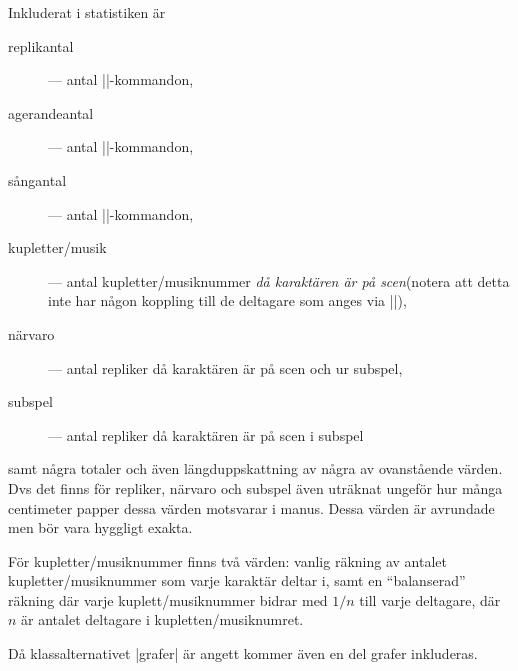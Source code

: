 \documentclass[a4paper,12pt]{article}
\begin{document}
Inkluderat i statistiken är
\begin{description}
	\item[replikantal] --- antal |\Namn|-kommandon,
	\item[agerandeantal] --- antal |\Namngr|-kommandon,
	\item[sångantal] --- antal |\Namnsj|-kommandon,
	\item[kupletter/musik] --- antal kupletter/musiknummer \emph{då karaktären är på scen}(notera att detta inte har någon koppling till de deltagare som anges via |\deltagare|),
	\item[närvaro] --- antal repliker då karaktären är på scen och ur subspel,
	\item[subspel] --- antal repliker då karaktären är på scen i subspel
\end{description}
samt några totaler och även längduppskattning av några av ovanstående värden. Dvs det finns för repliker, närvaro och subspel även uträknat ungeför hur många centimeter papper dessa värden motsvarar i manus. Dessa värden är avrundade men bör vara hyggligt exakta.

För kupletter/musiknummer finns två värden: vanlig räkning av antalet kupletter/musiknummer som varje karaktär deltar i, samt en ``balanserad'' räkning där varje kuplett/musiknummer bidrar med $1/n$ till varje deltagare, där $n$ är antalet deltagare i kupletten/musiknumret.

Då klassalternativet |grafer| är angett kommer även en del grafer inkluderas.






\appendix



\newpage
\end{document}
